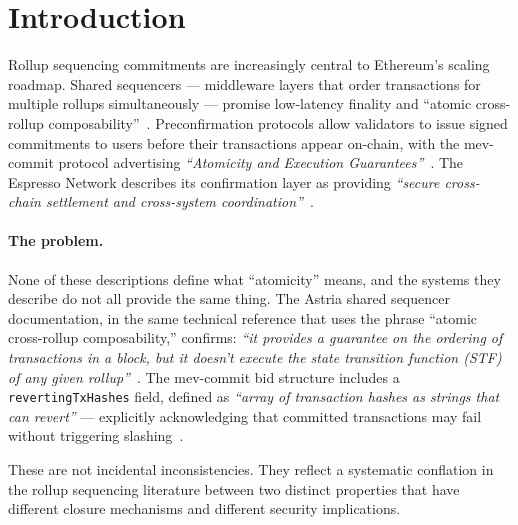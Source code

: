 %

\section{Introduction}
\label{sec:intro}

Rollup sequencing commitments are increasingly central to Ethereum's scaling
roadmap. Shared sequencers --- middleware layers that order transactions for
multiple rollups simultaneously --- promise low-latency finality and
``atomic cross-rollup composability''~\cite{Astria-README}. Preconfirmation
protocols allow validators to issue signed commitments to users before their
transactions appear on-chain, with the mev-commit protocol advertising
\emph{``Atomicity and Execution Guarantees''}~\cite{MevCommit-Marketing}.
The Espresso Network describes its confirmation layer as providing
\emph{``secure cross-chain settlement and cross-system
coordination''}~\cite{Espresso-Network}.

\paragraph{The problem.}
None of these descriptions define what ``atomicity'' means, and the systems
they describe do not all provide the same thing. The Astria shared sequencer
documentation, in the same technical reference that uses the phrase ``atomic
cross-rollup composability,'' confirms: \emph{``it provides a guarantee on
the ordering of transactions in a block, but it doesn't execute the state
transition function (STF) of any given rollup''}~\cite{Astria-TxFlow}. The
mev-commit bid structure includes a \texttt{revertingTxHashes} field,
defined as \emph{``array of transaction hashes as strings that can revert''}
--- explicitly acknowledging that committed transactions may fail without
triggering slashing~\cite{MevCommit-Docs}.

These are not incidental inconsistencies. They reflect a systematic
conflation in the rollup sequencing literature between two distinct
properties that have different closure mechanisms and different security
implications.

